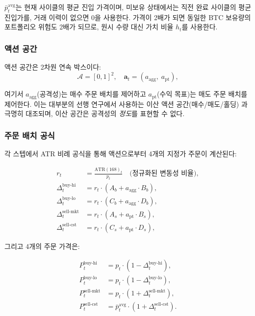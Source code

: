 \documentclass[11pt, a4paper]{article}
\begin{document}
$\bar{p}^\text{avg}_t$는 현재 사이클의 평균 진입 가격이며,
미보유 상태에서는 직전 완료 사이클의 평균 진입가를,
거래 이력이 없으면 0을 사용한다.
가격이 2배가 되면 동일한 BTC 보유량의 포트폴리오 위험도 2배가 되므로,
원시 수량 대신 가치 비율 $h_t$를 사용한다.

\subsubsection*{액션 공간}

액션 공간은 2차원 연속 박스이다:
\begin{equation}
    \mathcal{A} = [0, 1]^2,
    \quad
    \bm{a}_t = (a_\text{agg},\; a_\text{pt}),
\end{equation}

여기서 $a_\text{agg}$(공격성)는 매수 주문 배치를 제어하고
$a_\text{pt}$(수익 목표)는 매도 주문 배치를 제어한다.
이는 대부분의 선행 연구에서 사용하는 이산 액션 공간(매수/매도/홀딩)
\citep{liu2021bitcoin, yasin2024rl}과 극명히 대조되며,
이산 공간은 공격성의 \emph{정도}를 표현할 수 없다.

\subsubsection*{주문 배치 공식}

각 스텝에서 ATR 비례 공식을 통해 액션으로부터 4개의 지정가 주문이 계산된다:

\begin{align}
    r_t &= \frac{\text{ATR}(168)_t}{p_t}
           \quad \text{(정규화된 변동성 비율)}, \label{eq:atr_ratio} \\[4pt]
    \Delta^\text{buy-hi}_t  &= r_t \cdot (A_b + a_\text{agg}\cdot B_b), \label{eq:buy_hi} \\
    \Delta^\text{buy-lo}_t  &= r_t \cdot (C_b + a_\text{agg}\cdot D_b), \label{eq:buy_lo} \\
    \Delta^\text{sell-mkt}_t &= r_t \cdot (A_s + a_\text{pt}\cdot B_s), \label{eq:sell_mkt} \\
    \Delta^\text{sell-cst}_t &= r_t \cdot (C_s + a_\text{pt}\cdot D_s), \label{eq:sell_cst}
\end{align}

그리고 4개의 주문 가격은:

\begin{align}
    P^\text{buy-hi}_t  &= p_t\cdot(1 - \Delta^\text{buy-hi}_t), \\
    P^\text{buy-lo}_t  &= p_t\cdot(1 - \Delta^\text{buy-lo}_t), \\
    P^\text{sell-mkt}_t &= p_t\cdot(1 + \Delta^\text{sell-mkt}_t), \\
    P^\text{sell-cst}_t &= \bar{p}^\text{avg}_t\cdot(1 + \Delta^\text{sell-cst}_t).
\end{align}
\end{document}
